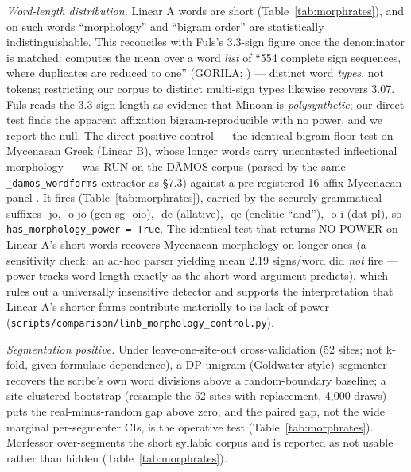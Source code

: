 \emph{Word-length distribution.} Linear A words are short
(Table~\ref{tab:morphrates}), and on such words ``morphology'' and
``bigram order'' are statistically indistinguishable. This reconciles
with Fuls's 3.3-sign figure once the denominator is matched:
\citet[57, \S6.5]{fuls2015} computes the mean over a word \emph{list} of
``554 complete sign sequences, where duplicates are reduced to one''
(GORILA; \citealp{godart1985}) --- distinct word \emph{types}, not
tokens; restricting our corpus to distinct multi-sign types likewise
recovers 3.07. Fuls reads the 3.3-sign length as evidence that Minoan is
\emph{polysynthetic}; our direct test finds the apparent affixation
bigram-reproducible with no power, and we report the null. The direct
positive control --- the identical bigram-floor test on Mycenaean Greek
(Linear B), whose longer words carry uncontested inflectional morphology
--- was RUN on the D\=AMOS corpus (parsed by the same
\texttt{\_damos\_wordforms} extractor as \S7.3) against a pre-registered
16-affix Mycenaean panel \citep{ventris1953}. It fires
(Table~\ref{tab:morphrates}), carried by the securely-grammatical
suffixes -jo, -o-jo (gen sg -oio), -de (allative), -qe (enclitic
``and''), -o-i (dat pl), so \texttt{has\_morphology\_power = True}. The
identical test that returns NO POWER on Linear A's short words recovers
Mycenaean morphology on longer ones (a sensitivity check: an ad-hoc
parser yielding mean 2.19 signs/word did \emph{not} fire --- power tracks
word length exactly as the short-word argument predicts), which rules out
a universally insensitive detector and supports the interpretation that
Linear A's shorter forms contribute materially to its lack of power
(\texttt{scripts/\allowbreak comparison/\allowbreak linb\_morphology\_control.py}).

\emph{Segmentation positive.} Under leave-one-site-out cross-validation (52
sites; not k-fold, given formulaic dependence), a DP-unigram
(Goldwater-style) segmenter recovers the scribe's own word divisions above
a random-boundary baseline; a site-clustered bootstrap (resample the 52
sites with replacement, 4,000 draws) puts the real-minus-random gap above
zero, and the paired gap, not the wide marginal per-segmenter CIs, is the
operative test (Table~\ref{tab:morphrates}). Morfessor over-segments the
short syllabic corpus and is reported as not usable rather than hidden
(Table~\ref{tab:morphrates}).

